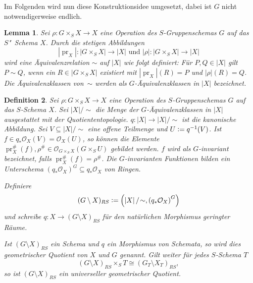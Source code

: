\documentclass[DIV11,11pt]{scrartcl}
\theoremstyle{Definitionen}
\newtheorem{Def}{Definition}[section]
\theoremstyle{Aussagen}
\newtheorem{Lem}[Def]{Lemma}
\newcommand{\coloneq}{\ensuremath{\mathrel{\mathop{\raisebox{0.5pt}{:}}}=}}
\DeclareMathOperator{\pr}{pr}
\begin{document}
Im Folgenden wird nun diese Konstruktionsidee umgesetzt, dabei ist $G$ nicht notwendigerweise endlich.

\begin{Lem}
Sei $\rho\colon G\times_S X\rightarrow X$ eine Operation des $S$-Gruppenschemas $G$ auf das $S$"~Schema $X$. Durch die stetigen Abbildungen
\begin{displaymath}
\left|\pr_X\right|\colon \left| G\times_S X\right|\rightarrow\left| X\right|\text{ und }\left|\rho\right|\colon\left| G\times_S X\right|\rightarrow\left| X\right|
\end{displaymath}
wird eine Äquivalenzrelation $\sim$ auf $\left| X\right|$ wie folgt definiert: Für $P,Q\in\left| X\right|$ gilt $P\sim Q$, wenn ein $R\in\left| G\times_S X\right|$ existiert mit $\left|\pr_X\right|(R)=P$ und $\left|\rho\right|(R)=Q$. Die Äquivalenzklassen von~$\sim$ werden als \textit{$G$-Äquivalenzklassen} in $\left| X \right|$ bezeichnet.
\end{Lem}

\begin{Def}\label{DefGeomQuot}
Sei $\rho\colon G\times_S X\rightarrow X$ eine Operation des $S$-Gruppenschemas $G$ auf das $S$-Schema $X$. Sei $\left| X\right|/\!\sim$ die Menge der $G$-Äquivalenzklassen in $\left| X\right|$ ausgestattet mit der Quotiententopologie. $q\colon\left| X\right|\rightarrow\left| X\right|/\!\!\sim$ ist die kanonische Abbildung. Sei $V\subseteq\left| X\right|/\!\sim$ eine offene Teilmenge und $U\coloneq q^{-1}(V)$. Ist $f\in q_*\mathcal{O}_X(V)=\mathcal{O}_X(U)$, so können die Elemente $\pr_X^{\#}(f),\rho^{\#}\in\mathcal{O}_{G\times_S X}(G\times_S U)$ gebildet werden. $f$ wird als \textit{$G$-invariant} bezeichnet, falls $\pr_X^{\#}(f)=\rho^{\#}$. Die $G$-invarianten Funktionen bilden ein Unterschema $\left(q_*\mathcal{O}_X\right)^G\subseteq q_*\mathcal{O}_X$ von Ringen.

Definiere
\begin{displaymath}
(G\setminus X)_{RS}\coloneq\left(\left| X\right|/\!\sim ,\left(q_*\mathcal{O}_X\right)^G\right)
\end{displaymath}
und schreibe $q\colon X\rightarrow (G\setminus X)_{RS}$ für den natürlichen Morphismus geringter Räume.

Ist $(G\setminus X)_{RS}$ ein Schema und $q$ ein Morphismus von Schemata, so wird dies \textit{geometrischer Quotient von $X$ und $G$} genannt. Gilt weiter für jedes $S$-Schema $T$
\begin{displaymath}
(G\setminus X)_{RS}\times_S T\cong(G_T\setminus X_T)_{RS},
\end{displaymath}
so ist $(G\setminus X)_{RS}$ ein \textit{universeller geometrischer Quotient}.
\end{Def}
\end{document}
